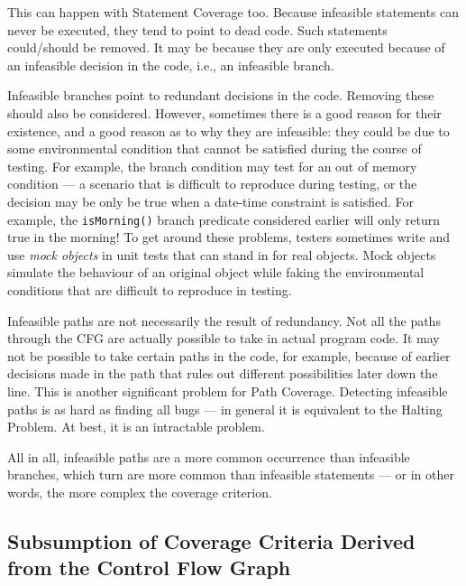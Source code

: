 This can happen with Statement Coverage too. Because infeasible statements can
never be executed, they tend to point to dead code. Such statements could/should
be removed. It may be because they are only executed because of an infeasible
decision in the code, i.e., an infeasible branch.


Infeasible branches point to redundant decisions in the code. Removing these
should also be considered. However, sometimes there is a good reason for their
existence, and a good reason as to why they are infeasible: they could be due to
some environmental condition that cannot be satisfied during the course of
testing. For example, the branch condition may test for an out of memory
condition --- a scenario that is difficult to reproduce during testing, or the
decision may be only be true when a date-time constraint is satisfied. For
example, the {\tt isMorning()} branch predicate considered earlier will only
return true in the morning! To get around these problems, testers sometimes
write and use {\it mock objects} in unit tests that can stand in for real
objects. Mock objects simulate the behaviour of an original object while faking
the environmental conditions that are difficult to reproduce in testing. 


Infeasible paths are not necessarily the result of redundancy. Not all the paths
through the CFG are actually possible to take in actual program code.  It may
not be possible to take certain paths in the code, for example, because of
earlier decisions made in the path that rules out different possibilities later
down the line. This is another significant problem for Path Coverage. Detecting
infeasible paths is as hard as finding all bugs --- in general it is equivalent
to the Halting Problem. At best, it is an intractable problem.

All in all, infeasible paths are a more common occurrence than infeasible
branches, which turn are more common than infeasible statements --- or in other
words, the more complex the coverage criterion. 


\subsection{Subsumption of Coverage Criteria Derived from the Control Flow Graph} 

